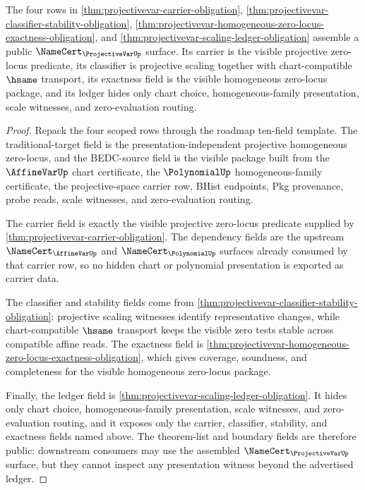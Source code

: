 \begin{theorem}
\label{thm:projectivevar-public-namecert-export}
The four rows in \autoref{thm:projectivevar-carrier-obligation}, \autoref{thm:projectivevar-classifier-stability-obligation}, \autoref{thm:projectivevar-homogeneous-zero-locus-exactness-obligation}, and \autoref{thm:projectivevar-scaling-ledger-obligation} assemble a public $\NameCert_{\ProjectiveVarUp}$ surface. Its carrier is the visible projective zero-locus predicate, its classifier is projective scaling together with chart-compatible $\hsame$ transport, its exactness field is the visible homogeneous zero-locus package, and its ledger hides only chart choice, homogeneous-family presentation, scale witnesses, and zero-evaluation routing.
\end{theorem}
\begin{proof}
Repack the four scoped rows through the roadmap ten-field template. The traditional-target field is the presentation-independent projective homogeneous zero-locus, and the BEDC-source field is the visible package built from the $\AffineVarUp$ chart certificate, the $\PolynomialUp$ homogeneous-family certificate, the projective-space carrier row, BHist endpoints, Pkg provenance, probe reads, scale witnesses, and zero-evaluation routing.

The carrier field is exactly the visible projective zero-locus predicate supplied by \autoref{thm:projectivevar-carrier-obligation}. The dependency fields are the upstream $\NameCert_{\AffineVarUp}$ and $\NameCert_{\PolynomialUp}$ surfaces already consumed by that carrier row, so no hidden chart or polynomial presentation is exported as carrier data.

The classifier and stability fields come from \autoref{thm:projectivevar-classifier-stability-obligation}: projective scaling witnesses identify representative changes, while chart-compatible $\hsame$ transport keeps the visible zero tests stable across compatible affine reads. The exactness field is \autoref{thm:projectivevar-homogeneous-zero-locus-exactness-obligation}, which gives coverage, soundness, and completeness for the visible homogeneous zero-locus package.

Finally, the ledger field is \autoref{thm:projectivevar-scaling-ledger-obligation}. It hides only chart choice, homogeneous-family presentation, scale witnesses, and zero-evaluation routing, and it exposes only the carrier, classifier, stability, and exactness fields named above. The theorem-list and boundary fields are therefore public: downstream consumers may use the assembled $\NameCert_{\ProjectiveVarUp}$ surface, but they cannot inspect any presentation witness beyond the advertised ledger.
\end{proof}

